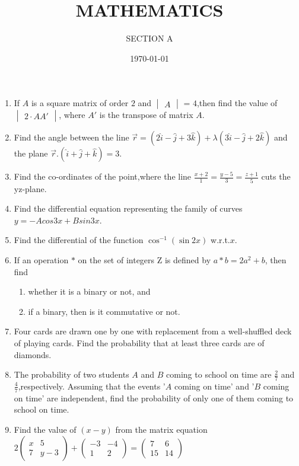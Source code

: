 \documentclass[10pt,-letter paper]{article}
\title{MATHEMATICS}
\author{SECTION A}
\date{\today}
\providecommand{\brak}[1]{\ensuremath{\left(#1\right)}}
\newcommand{\myvec}[1]{\ensuremath{\begin{pmatrix}#1\end{pmatrix}}}
\newcommand{\mydet}[1]{\ensuremath{\begin{vmatrix}#1\end{vmatrix}}}
\begin{document}
     \maketitle

     \begin{enumerate}
     \item If $A$ is a square matrix of order $2$ and $\mydet{A}$ = $4$,then find the value of $\mydet{2\cdot AA'}$, where $A'$ is the transpose of matrix $A$.

\item Find the angle between the line $\overrightarrow{r}=\brak{2\hat{i}-\hat
{j}+3\hat{k}}+\lambda\brak{3\hat{i}-\hat{j}+2\hat{k}}$ and the plane $\overrightarrow{r}.\brak{\hat{i}+\hat{j}+\hat{k}}=3$.

\item Find the co-ordinates of the point,where the line $\frac{x+2}{1}=\frac{y-5}{3}=\frac{z+1}{5}$ cuts the yz-plane.

\item Find the differential equation representing the family of curves $y=-Acos 3x+B sin 3x$.

\item Find the differential of the function $\cos^{-1}\brak{\sin 2x}$ w.r.t.$x$.

\item If an operation $\ast$ on the set of integers Z is defined by $a \ast b = 2a^{2}+b$, then find 
\begin{enumerate}
	\item whether it is a binary or not, and
	\item if a binary, then is it commutative or not. 
\end{enumerate}

\item Four cards are drawn one by one with replacement from a well-shuffled deck of playing cards. Find the probability that at least three cards are of diamonds.

\item The probability of two students $A$ and $B$ coming to school on time are $\frac{2}{7}$ and $\frac{4}{7}$,respectively. Assuming that the events '$A$ coming on time' and '$B$ coming on time' are independent, find the probability of only one of them coming to school on time.

\item Find the value of $\brak{x-y}$ from the matrix equation
	$2\myvec{x & 5 \\ 7 & y-3} + \myvec{-3 & -4 \\ 1 & 2}= \myvec{7 & 6 \\ 15 & 14}$


\end{enumerate}
\end{document}
